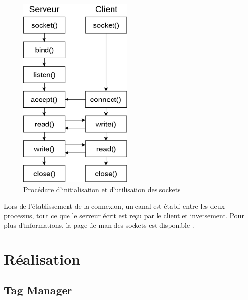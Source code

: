 \documentclass[a4paper, 12pt]{article}
\begin{document}
\begin{figure}
    \begin{center}
        \includegraphics[width=0.5\textwidth]{images/sockets.png}
    \end{center}
    \caption{Procédure d'initialisation et d'utilisation des sockets}
    \label{sockets_procedure}
\end{figure}
Lors de l'établissement de la connexion, un canal est établi entre les deux processus, tout ce que 
le serveur écrit est reçu par le client et inversement. Pour plus d'informations, la page de man 
des sockets est disponible \cite{ref39}.
\newpage


\section{Réalisation} %
\subsection{Tag Manager}
\end{document}
